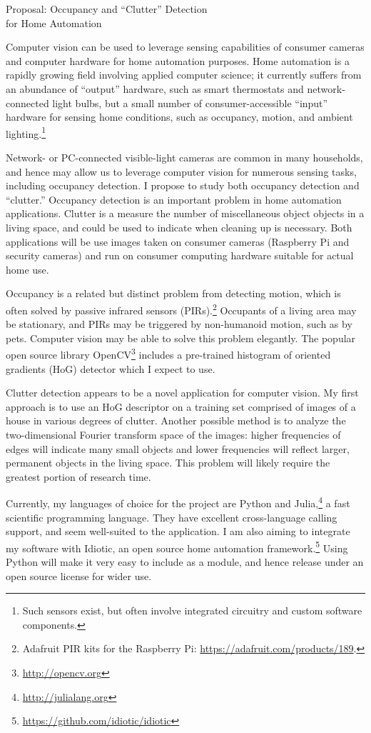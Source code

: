 \documentclass{article}
\begin{document}
\begin{center}
    \LARGE Proposal: Occupancy and ``Clutter'' Detection \\
    for Home Automation
\end{center}

Computer vision can be used to leverage sensing capabilities of consumer cameras
and computer hardware for home automation purposes. Home automation is a rapidly
growing field involving applied computer science; it currently suffers from
an abundance of ``output'' hardware, such as smart thermostats and
network-connected light bulbs, but a small number of consumer-accessible
``input'' hardware for sensing home conditions, such as occupancy, motion, and
ambient lighting.\footnote{Such sensors exist, but often involve integrated
circuitry and custom software components.}

Network- or PC-connected visible-light cameras are common in many households,
and hence may allow us to leverage computer vision for numerous sensing tasks,
including occupancy detection. I propose to study both occupancy detection and
``clutter.'' Occupancy detection is an important problem in home automation
applications. Clutter is a measure the number of miscellaneous object objects
in a living space, and could be used to indicate when cleaning up is necessary.
Both applications will be use images taken on consumer cameras (Raspberry Pi and
security cameras) and run on consumer computing hardware suitable for actual
home use.

Occupancy is a related but distinct problem from detecting motion, which is
often solved by passive infrared sensors (PIRs).\footnote{Adafruit PIR kits
    for the Raspberry Pi: \url{https://adafruit.com/products/189}.}
Occupants of a living area may be stationary, and PIRs may be triggered by
non-humanoid motion, such as by pets. Computer vision may be able to solve this
problem elegantly. The popular open source library
OpenCV\footnote{\url{http://opencv.org}}
includes a pre-trained histogram of oriented gradients (HoG) detector which I
expect to use.

Clutter detection appears to be a novel application for computer vision. My
first approach is to use an HoG descriptor on a training set comprised of images
of a house in various degrees of clutter. Another possible method is to analyze
the two-dimensional Fourier transform space of the images: higher frequencies of
edges will indicate many small objects and lower frequencies will reflect
larger, permanent objects in the living space. This problem will likely require
the greatest portion of research time.

Currently, my languages of choice for the project are Python and
Julia,\footnote{\url{http://julialang.org}} a fast scientific programming
language. They have excellent cross-language calling support, and seem
well-suited to the application. I am also aiming to integrate my software with
Idiotic, an open source home automation
framework.\footnote{\url{https://github.com/idiotic/idiotic}} Using Python will
make it very easy to include as a module, and hence release under an open source
license for wider use.
\end{document}
